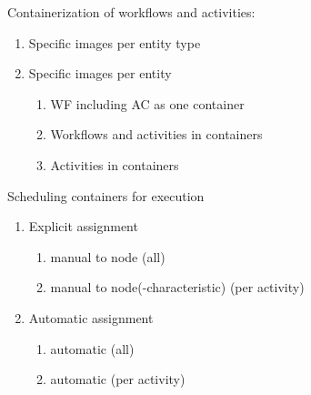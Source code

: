 Containerization of workflows and activities:
\begin{enumerate}[nosep]
  \item Specific images per entity type
  \item Specific images per entity
    \begin{enumerate}[nosep]
      \item WF including AC as one container
      \item Workflows and activities in containers
      \item Activities in containers
    \end{enumerate}
\end{enumerate}

Scheduling containers for execution
\begin{enumerate}[nosep]
  \item Explicit assignment
    \begin{enumerate}[nosep]
      \item manual to node (all)
      \item manual to node(-characteristic) (per activity)
    \end{enumerate}
  \item Automatic assignment
    \begin{enumerate}[nosep]
      \item automatic (all)
      \item automatic (per activity)
    \end{enumerate}
\end{enumerate}

